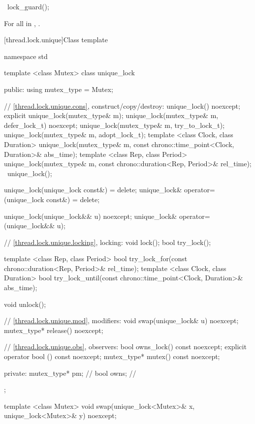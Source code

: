 %
\begin{itemdecl}
~lock_guard();
\end{itemdecl}

\begin{itemdescr}
\pnum
\effects For all  in \tcode{[0, sizeof...(MutexTypes))},
.
\end{itemdescr}

[thread.lock.unique]{Class template }

\begin{codeblock}
namespace std {
  template <class Mutex>
  class unique_lock {
  public:
    using mutex_type = Mutex;

    // \ref{thread.lock.unique.cons}, construct/copy/destroy:
    unique_lock() noexcept;
    explicit unique_lock(mutex_type& m);
    unique_lock(mutex_type& m, defer_lock_t) noexcept;
    unique_lock(mutex_type& m, try_to_lock_t);
    unique_lock(mutex_type& m, adopt_lock_t);
    template <class Clock, class Duration>
      unique_lock(mutex_type& m, const chrono::time_point<Clock, Duration>& abs_time);
    template <class Rep, class Period>
      unique_lock(mutex_type& m, const chrono::duration<Rep, Period>& rel_time);
    ~unique_lock();

    unique_lock(unique_lock const&) = delete;
    unique_lock& operator=(unique_lock const&) = delete;

    unique_lock(unique_lock&& u) noexcept;
    unique_lock& operator=(unique_lock&& u);

    // \ref{thread.lock.unique.locking}, locking:
    void lock();
    bool try_lock();

    template <class Rep, class Period>
      bool try_lock_for(const chrono::duration<Rep, Period>& rel_time);
    template <class Clock, class Duration>
      bool try_lock_until(const chrono::time_point<Clock, Duration>& abs_time);

    void unlock();

    // \ref{thread.lock.unique.mod}, modifiers:
    void swap(unique_lock& u) noexcept;
    mutex_type* release() noexcept;

    // \ref{thread.lock.unique.obs}, observers:
    bool owns_lock() const noexcept;
    explicit operator bool () const noexcept;
    mutex_type* mutex() const noexcept;

  private:
    mutex_type* pm; // \expos
    bool owns;      // \expos
  };

  template <class Mutex>
    void swap(unique_lock<Mutex>& x, unique_lock<Mutex>& y) noexcept;
}
\end{codeblock}

